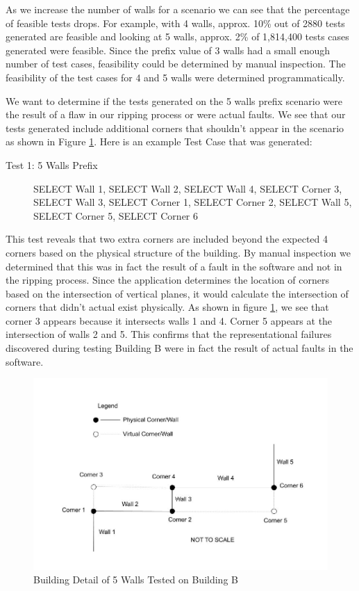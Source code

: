 \documentclass[final,3p]{CSP}
\begin{document}
As we increase the number of walls for a scenario we can see that the percentage of feasible tests drops.  For example, with 4 walls, approx. 10\% out of 2880 tests generated are feasible and looking at 5 walls, approx. 2\% of 1,814,400 tests cases generated were feasible.  Since the prefix value of 3 walls had a small enough number of test cases, feasibility could be determined by manual inspection.  The feasibility of the test cases for 4 and 5 walls were determined programmatically.

We want to determine if the tests generated on the 5 walls prefix scenario were the result of a flaw in our ripping process or were actual faults.  We see that our tests generated include additional corners that shouldn't appear in the scenario as shown in Figure \ref{fig:bldBdetail}.  Here is an example Test Case that was generated:

\begin{description}
  \item[Test 1: 5 Walls Prefix] SELECT Wall 1, SELECT Wall 2, SELECT Wall 4, SELECT Corner 3, SELECT Wall 3, SELECT Corner 1, SELECT Corner 2, SELECT Wall 5, SELECT Corner 5, SELECT Corner 6
\end{description}

This test reveals that two extra corners are included beyond the expected 4 corners based on the physical structure of the building.  By manual inspection we determined that this was in fact the result of a fault in the software and not in the ripping process.  Since the application determines the location of corners based on the intersection of vertical planes, it would calculate the intersection of corners that didn't actual exist physically.  As shown in figure \ref{fig:bldBdetail}, we see that corner 3 appears because it intersects walls 1 and 4. Corner 5 appears at the intersection of walls 2 and 5.  This confirms that the representational failures discovered during testing Building B were in fact the result of actual faults in the software.

\begin{figure}
    \centering
    \includegraphics[width=\textwidth]{Building5detail.jpg}
    \caption{Building Detail of 5 Walls Tested on Building B}
    \label{fig:bldBdetail}
\end{figure}
\end{document}
